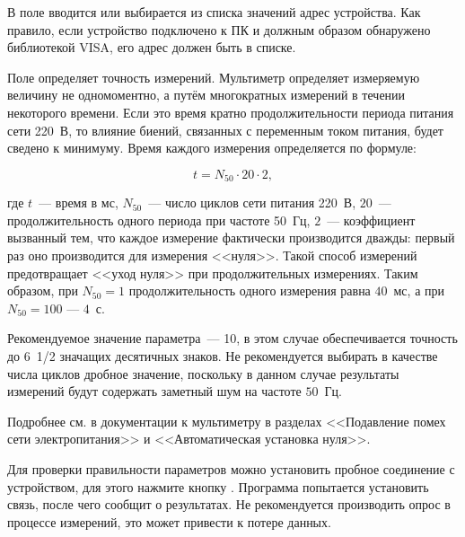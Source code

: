В поле  вводится или выбирается из списка значений адрес устройства. Как правило, если устройство подключено к ПК и должным образом обнаружено библиотекой VISA, его адрес должен быть в списке.

Поле  определяет точность измерений. Мультиметр определяет измеряемую величину не одномоментно, а путём многократных измерений в течении некоторого времени. Если это время кратно продолжительности периода питания сети 220~В, то влияние биений, связанных с переменным током питания, будет сведено к минимуму. Время каждого измерения определяется по формуле:

\begin{equation}
t = N_{50} \cdot 20 \cdot 2,
\end{equation}

\noindent где $t$~--- время в мс, $N_{50}$~--- число циклов сети питания 220~В, $20$~--- продолжительность одного периода при частоте 50~Гц, $2$~--- коэффициент вызванный тем, что каждое измерение фактически производится дважды: первый раз оно производится для измерения <<нуля>>. Такой способ измерений предотвращает <<уход нуля>> при продолжительных измерениях. Таким образом, при $N_{50} = 1$ продолжительность одного измерения равна $40$~мс, а при $N_{50} = 100$ --- $4$~с.

Рекомендуемое значение параметра~--- 10, в этом случае обеспечивается точность до \mbox{6 1/2} значащих десятичных знаков. Не рекомендуется выбирать в качестве числа циклов дробное значение, поскольку в данном случае результаты измерений будут содержать заметный шум на частоте $50$~Гц. 

Подробнее см. в документации к мультиметру в разделах <<Подавление помех сети электропитания>> и <<Автоматическая установка нуля>>.

Для проверки правильности параметров можно установить пробное соединение с устройством, для этого нажмите кнопку . Программа попытается установить связь, после чего сообщит о результатах. Не рекомендуется производить опрос в процессе измерений, это может привести к потере данных.
